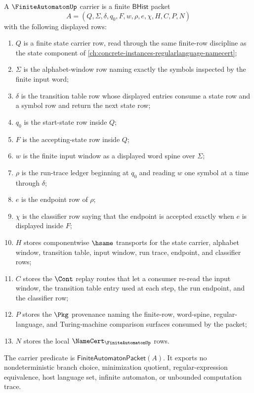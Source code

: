 \begin{definition}
\label{def:finite-automaton-carrier}
A $\FiniteAutomatonUp$ carrier is a finite $\mathsf{BHist}$ packet
$$
A=(Q,\Sigma,\delta,q_0,F,w,\rho,e,\chi,H,C,P,N)
$$
with the following displayed rows:
\begin{enumerate}
\item $Q$ is a finite state carrier row, read through the same finite-row
discipline as the state component of
\autoref{ch:concrete-instances-regularlanguage-namecert};
\item $\Sigma$ is the alphabet-window row naming exactly the symbols inspected
by the finite input word;
\item $\delta$ is the transition table row whose displayed entries consume a
state row and a symbol row and return the next state row;
\item $q_0$ is the start-state row inside $Q$;
\item $F$ is the accepting-state row inside $Q$;
\item $w$ is the finite input window as a displayed word spine over $\Sigma$;
\item $\rho$ is the run-trace ledger beginning at $q_0$ and reading $w$ one
symbol at a time through $\delta$;
\item $e$ is the endpoint row of $\rho$;
\item $\chi$ is the classifier row saying that the endpoint is accepted exactly
when $e$ is displayed inside $F$;
\item $H$ stores componentwise $\hsame$ transports for the state carrier,
alphabet window, transition table, input window, run trace, endpoint, and
classifier rows;
\item $C$ stores the $\Cont$ replay routes that let a consumer re-read the
input window, the transition table entry used at each step, the run endpoint,
and the classifier row;
\item $P$ stores the $\Pkg$ provenance naming the finite-row, word-spine,
regular-language, and Turing-machine comparison surfaces consumed by the
packet;
\item $N$ stores the local $\NameCert_{\FiniteAutomatonUp}$ rows.
\end{enumerate}
The carrier predicate is
$\mathsf{FiniteAutomatonPacket}(A)$. It exports no nondeterministic branch
choice, minimization quotient, regular-expression equivalence, host language
set, infinite automaton, or unbounded computation trace.
\end{definition}

